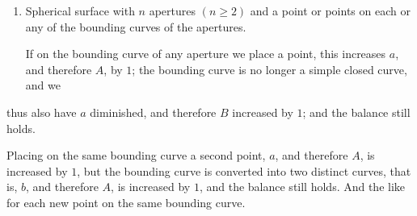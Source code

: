 \documentclass[11pt,a4paper]{book}
\begin{document}
\begin{enumerate}
where, comparing with case $5$, we see the different effects of a point and an aperture.

\item Spherical surface with $n$ apertures $(n \geq 2)$ and a point or points on each or
any of the bounding curves of the apertures.

If on the bounding curve of any aperture we place a point, this increases $a$, and
therefore $A$, by $1$; the bounding curve is no longer a simple closed curve, and we

\end{enumerate}

\clearpage

thus also have $a$ diminished, and therefore $B$ increased by $1$; and the balance still
holds.

Placing on the same bounding curve a second point, $a$, and therefore $A$, is
increased by $1$, but the bounding curve is converted into two distinct curves, that
is, $b$, and therefore $A$, is increased by $1$, and the balance still holds. And the like
for each new point on the same bounding curve.
\end{document}
